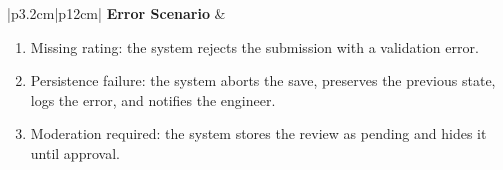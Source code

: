 \begin{table}[H]
\begin{tabular}{|p{3.2cm}|p{12cm}|}
        \hline
        \textbf{Error Scenario} & \begin{minipage}[t]{\linewidth}
            \begin{enumerate}[topsep=0pt,itemsep=1pt,parsep=0pt,partopsep=0pt]
                \item Missing rating: the system rejects the submission with a validation error.
                \item Persistence failure: the system aborts the save, preserves the previous state, logs the error, and notifies the engineer.
                \item Moderation required: the system stores the review as pending and hides it until approval.
            \end{enumerate}
        \end{minipage} \\
        \hline
    \end{tabular}
    \label{tab:eng-rate-review}
\end{table}


